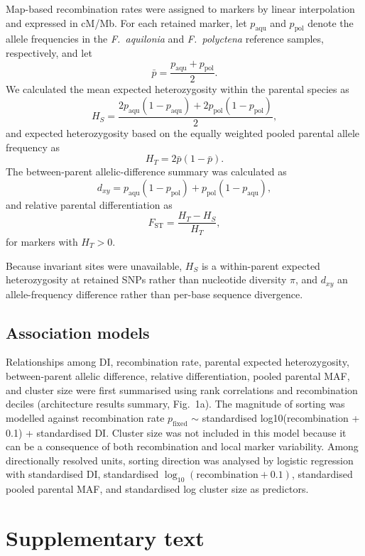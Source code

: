 \documentclass[11pt]{article}
\newcommand{\Faq}{\textit{F.~aquilonia}}
\newcommand{\Fpo}{\textit{F.~polyctena}}
\begin{document}
Map-based recombination rates were assigned to markers by linear interpolation and expressed in cM/Mb. For each retained marker, let \(p_{\mathrm{aqu}}\) and \(p_{\mathrm{pol}}\) denote the allele frequencies in the \Faq{} and \Fpo{} reference samples, respectively, and let
\[
\bar p=\frac{p_{\mathrm{aqu}}+p_{\mathrm{pol}}}{2}.
\]
We calculated the mean expected heterozygosity within the parental species as
\[
H_S=
\frac{
2p_{\mathrm{aqu}}(1-p_{\mathrm{aqu}})
+
2p_{\mathrm{pol}}(1-p_{\mathrm{pol}})
}{2},
\]
and expected heterozygosity based on the equally weighted pooled parental allele frequency as
\[
H_T=2\bar p(1-\bar p).
\]
The between-parent allelic-difference summary was calculated as
\[
d_{xy}
=
p_{\mathrm{aqu}}(1-p_{\mathrm{pol}})
+
p_{\mathrm{pol}}(1-p_{\mathrm{aqu}}),
\]
and relative parental differentiation as
\[
F_{\mathrm{ST}}=\frac{H_T-H_S}{H_T},
\]
for markers with \(H_T>0\).

Because invariant sites were unavailable, \(H_S\) is a within-parent expected heterozygosity at retained SNPs rather than nucleotide diversity \(\pi\), and \(d_{xy}\) an allele-frequency difference rather than per-base sequence divergence.


\subsection*{Association models}

Relationships among DI, recombination rate, parental expected heterozygosity, between-parent allelic difference, relative differentiation, pooled parental MAF, and cluster size were first summarised using rank correlations and recombination deciles (architecture results summary, Fig.~1a). The magnitude of sorting was modelled against recombination rate $p_{\mathrm{fixed}}$ $\sim{}$   standardised log10(recombination + 0.1) + standardised DI. Cluster size was not included in this model because it can be a consequence of both recombination and local marker variability. Among directionally resolved units, sorting direction was analysed by logistic regression with standardised DI, standardised \(\log_{10}(\mathrm{recombination}+0.1)\), standardised pooled parental MAF, and standardised log cluster size as predictors.

\clearpage
\setcounter{figure}{0}
\renewcommand{\thefigure}{S\arabic{figure}}
\section*{Supplementary text}
\end{document}
